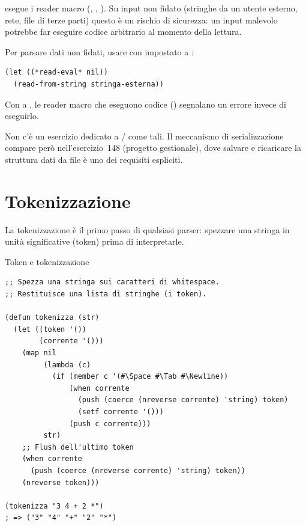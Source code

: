 \begin{attenzione}
 esegue i reader macro (, , \fn{,}).
Su input non fidato (stringhe da un utente esterno, rete, file
di terze parti) questo è un rischio di sicurezza: un input
malevolo potrebbe far eseguire codice arbitrario al momento
della lettura.

\medskip
Per parsare dati non fidati, usare  con
 impostato a :
\begin{lstlisting}
(let ((*read-eval* nil))
  (read-from-string stringa-esterna))
\end{lstlisting}
Con  a , le reader macro che
eseguono codice () segnalano un errore invece
di eseguirlo.
\end{attenzione}

\begin{nota}
Non c'è un esercizio dedicato a / come tali.
Il meccanismo di serializzazione compare però nell'esercizio~148
(progetto gestionale), dove salvare e ricaricare la struttura dati
da file è uno dei requisiti espliciti.
\end{nota}

\section{Tokenizzazione}

La tokenizzazione è il primo passo di qualsiasi parser:
spezzare una stringa in unità significative (token)
prima di interpretarle.

\begin{concetto}{Token e tokenizzazione}
\end{concetto}

\begin{esempio}
\begin{lstlisting}
;; Spezza una stringa sui caratteri di whitespace.
;; Restituisce una lista di stringhe (i token).

(defun tokenizza (str)
  (let ((token '())
        (corrente '()))
    (map nil
         (lambda (c)
           (if (member c '(#\Space #\Tab #\Newline))
               (when corrente
                 (push (coerce (nreverse corrente) 'string) token)
                 (setf corrente '()))
               (push c corrente)))
         str)
    ;; Flush dell'ultimo token
    (when corrente
      (push (coerce (nreverse corrente) 'string) token))
    (nreverse token)))

(tokenizza "3 4 + 2 *")
; => ("3" "4" "+" "2" "*")
\end{lstlisting}
\end{esempio}

